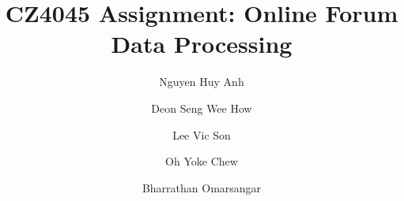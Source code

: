 \documentclass[sigconf]{acmart}
\begin{document}
\title{CZ4045 Assignment: Online Forum Data Processing}

\author{Nguyen Huy Anh}
\author{Deon Seng Wee How}
\author{Lee Vic Son}
\author{Oh Yoke Chew}
\author{Bharrathan Omarsangar}



\maketitle




 
\end{document}
